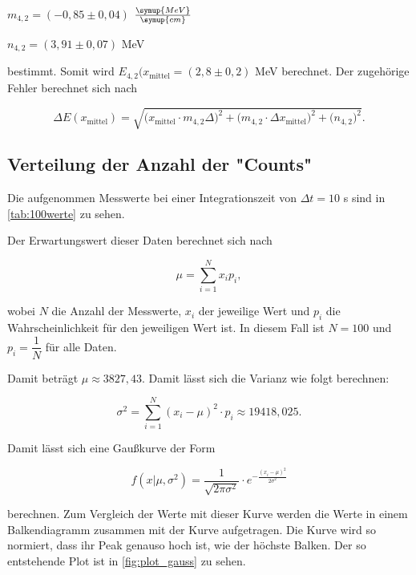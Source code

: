 \begin{center}
    $m_{4,2} = (-0,85 \pm 0,04)$ $\frac{\symup{MeV}}{\symup{cm}}$

    $n_{4,2} = (3,91 \pm 0,07)$ MeV
\end{center}

bestimmt.
Somit wird $E_{4,2}(x_\text{mittel} = (2,8 \pm 0,2)$ MeV berechnet. Der zugehörige Fehler berechnet sich nach

\begin{equation}
    \Delta E(x_\text{mittel}) = \sqrt{\bigg( x_\text{mittel} \cdot m_{4,2} \Delta \bigg)^2 + \bigg(m_{4,2} \cdot \Delta x_\text{mittel} \bigg)^2 + \bigg( n_{4,2} \bigg)^2}.
\end{equation}




\subsection{Verteilung der Anzahl der "Counts"}

Die aufgenommen Messwerte bei einer Integrationszeit von $\Delta t = 10$ s sind in \autoref{tab:100werte} zu sehen.



Der Erwartungswert dieser Daten berechnet sich nach

\begin{equation}
    \mu = \sum_{i=1}^{N} x_i p_i,
\end{equation}

wobei $N$ die Anzahl der Messwerte, $x_i$ der jeweilige Wert und $p_i$ die Wahrscheinlichkeit für den jeweiligen Wert ist.
In diesem Fall ist $N = 100$ und $p_i = \dfrac{1}{N}$ für alle Daten.

Damit beträgt $\mu \approx 3827,43$.
Damit lässt sich die Varianz wie folgt berechnen:

\begin{equation}
    \sigma^2 = \sum_{i=1}^{N} (x_i - \mu)^2 \cdot p_i \approx 19418,025.
\end{equation}

Damit lässt sich eine Gaußkurve der Form

\begin{equation}
    f(x | \mu, \sigma^2) = \frac{1}{\sqrt{2 \pi \sigma^2}} \cdot e^{- \frac{(x_i - \mu)^2}{2 \sigma^2}}
\end{equation}

berechnen. Zum Vergleich der Werte mit dieser Kurve werden die Werte in einem Balkendiagramm zusammen mit der Kurve aufgetragen.
Die Kurve wird so normiert, dass ihr Peak genauso hoch ist, wie der höchste Balken. Der so entstehende Plot ist in \autoref{fig:plot_gauss} zu sehen.

